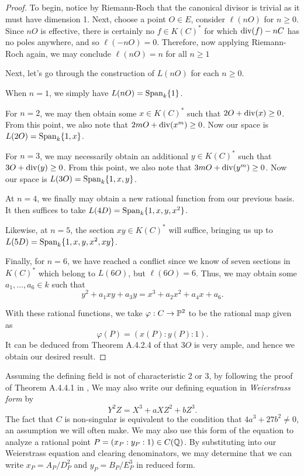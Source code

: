\begin{proof}
    To begin,
    notice by Riemann-Roch that the canonical divisor is trivial as it must have dimension 1.
    Next, choose a point $O \in E$, consider $\ell(nO)$ for $n \geq 0$.
    Since $nO$ is effective, there is certainly no $f \in K(C)^*$ for which ${\rm div}(f) - nC$ has no poles anywhere,
    and so $\ell(-nO) = 0$.
    Therefore, now applying Riemann-Roch again, we may conclude $\ell(nO) = n$ for all $n \geq 1$

    Next, let's go through the construction of $L(nO)$ for each $n \geq 0$.

    When $n = 1$, we simply have $L(nO) = {\rm Span}_k\{1\}$.
    
    For $n = 2$, we may then obtain some $x \in K(C)^*$ such that $2O + {\rm div}(x) \geq 0$.
    From this point, we also note that $2mO + {\rm div}(x^m) \geq 0$. Now our space is $L(2O) = {\rm Span}_k\{1, x\}$.

    For $n = 3$, we may necessarily obtain an additional $y \in K(C)^*$ such that $3O + {\rm div}(y) \geq 0$.
    From this point, we also note that $3mO + {\rm div}(y^m) \geq 0$. Now our space is $L(3O) = {\rm Span}_k\{1, x, y\}$.

    At $n = 4$, we finally may obtain a new rational function from our previous basis.
    It then suffices to take $L(4D) = {\rm Span}_k \{1, x, y, x^2 \}$.

    Likewise, at $n = 5$, the section $xy \in K(C)^*$ will suffice,
    bringing us up to $L(5D) = {\rm Span}_k \{1, x, y, x^2, xy \}$.

    Finally, for $n = 6$, we have reached a conflict since we know of seven sections in $K(C)^*$ which belong to $L(6O)$, but $\ell(6O) = 6$.
    Thus, we may obtain some $a_1, \ldots, a_6 \in k$ such that
    \[
        y^2 + a_1 xy + a_3 y
        = x^3 + a_2 x^2 + a_4 x + a_6.  
    \]

    With these rational functions, we take $\varphi: C \to \mathbb{P}^2$ to be the rational map given as
    \[
        \varphi(P) = (x(P) : y(P) : 1).
    \]
    It can be deduced from Theorem A.4.2.4 of \cite{Silverman_Hindry_2013} that $3O$ is very ample, 
    and hence we obtain our desired result.

\end{proof}

Assuming the defining field is not of characteristic 2 or 3,
by following the proof of Theorem A.4.4.1 in \cite{Silverman_Hindry_2013},
We may also write our defining equation in \textit{Weierstrass form} by
\[
    Y^2Z = X^3 + aXZ^2 + bZ^3.
\]
The fact that $C$ is non-singular is equivalent to the condition that $4a^3 + 27b^2 \neq 0$,
an assumption we will often make.
We may also use this form of the equation to analyze a rational point $P = (x_P : y_P : 1) \in C(\mathbb{Q})$.
By substituting into our Weierstrass equation and clearing denominators,
we may determine that we can write $x_P = A_P / D_P^2$ and $y_P = B_P / E_P^3$ in reduced form.



